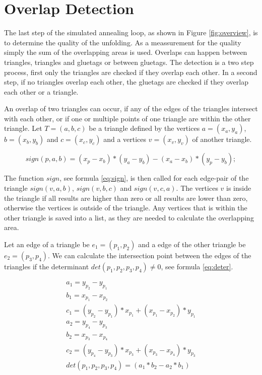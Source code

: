 \documentclass[draft,final]{vutinfth} %
\begin{document}
\section{Overlap Detection}

The last step of the simulated annealing loop, as shown in Figure \ref{fig:overview}, is to determine the quality of the unfolding. As a meassurement for the quality simply the sum of the overlapping areas is used. Overlaps can happen between triangles, triangles and gluetags or between gluetags. The detection is a two step process, first only the triangles are checked if they overlap each other. In a second step, if no triangles overlap each other, the gluetags are checked if they overlap each other or a triangle.

An overlap of two triangles can occur, if any of the edges of the triangles intersect with each other, or if one or multiple points of one triangle are within the other triangle. Let $T = (a,b,c)$ be a triangle defined by the vertices $a = (x_a, y_a)$, $b = (x_b, y_b)$ and $c = (x_c, y_c)$ and a vertices $v = (x_v, y_v)$ of another triangle.

\begin{equation}
\label{eq:sign}
sign(p, a, b) = (x_p - x_b) * (y_a - y_b) - (x_a - x_b) * (y_p - y_b);
\end{equation}

The function $sign$, see formula \ref{eq:sign}, is then called for each edge-pair of the triangle $sign(v, a, b)$, $sign(v, b, c)$ and $sign(v, c, a)$. The vertices $v$ is inside the triangle if all results are higher than zero or all results are lower than zero, otherwise the vertices is outside of the triangle.
Any vertices that is within the other triangle is saved into a list, as they are needed to calculate the overlapping area.

Let an edge of a triangle be $e_1 = (p_1, p_2)$ and a edge of the other triangle be $e_2 = (p_3, p_4)$. We can calculate the intersection point between the edges of the triangles if the determinant $det(p_1, p_2, p_3, p_4) \neq 0$, see formula \ref{eq:deter}.


\begin{align}
a_1 = y_{p_2} - y_{p_1}\\
b_1 = x_{p_1} - x_{p_2}\\
c_1 = (y_{p_2} - y_{p_1}) * x_{p_1} + (x_{p_1} - x_{p_2}) * y_{p_1}\\
a_2 = y_{p_4} - y_{p_3}\\
b_2 = x_{p_3} - x_{p_4}\\
c_2 = (y_{p_4} - y_{p_3}) * x_{p_3} + (x_{p_3} - x_{p_4}) * y_{p_3}\\
det(p_1, p_2, p_3, p_4) = (a_1*b_2 - a_2*b_1)
\label{eq:deter}
\end{align}
\end{document}
